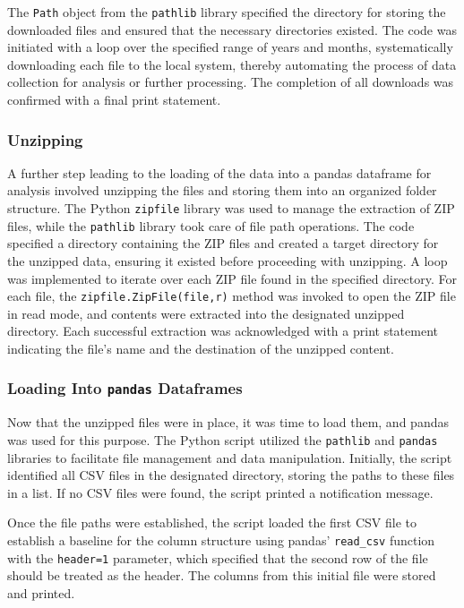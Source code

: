 \documentclass[
]{article}
\begin{document}
The \texttt{Path} object from the \texttt{pathlib} library specified the
directory for storing the downloaded files and ensured that the
necessary directories existed. The code was initiated with a loop over
the specified range of years and months, systematically downloading each
file to the local system, thereby automating the process of data
collection for analysis or further processing. The completion of all
downloads was confirmed with a final print statement.

\subsubsection{Unzipping}\label{unzipping}

A further step leading to the loading of the data into a pandas
dataframe for analysis involved unzipping the files and storing them
into an organized folder structure. The Python \texttt{zipfile} library
was used to manage the extraction of ZIP files, while the
\texttt{pathlib} library took care of file path operations. The code
specified a directory containing the ZIP files and created a target
directory for the unzipped data, ensuring it existed before proceeding
with unzipping. A loop was implemented to iterate over each ZIP file
found in the specified directory. For each file, the
\texttt{zipfile.ZipFile(file,\textquotesingle{}r\textquotesingle{})}
method was invoked to open the ZIP file in read mode, and contents were
extracted into the designated unzipped directory. Each successful
extraction was acknowledged with a print statement indicating the file's
name and the destination of the unzipped content.

\subsubsection{\texorpdfstring{Loading Into \texttt{pandas}
Dataframes}{Loading Into pandas Dataframes}}\label{loading-into-pandas-dataframes}

Now that the unzipped files were in place, it was time to load them, and
pandas was used for this purpose. The Python script utilized the
\texttt{pathlib} and \texttt{pandas} libraries to facilitate file
management and data manipulation. Initially, the script identified all
CSV files in the designated directory, storing the paths to these files
in a list. If no CSV files were found, the script printed a notification
message.

Once the file paths were established, the script loaded the first CSV
file to establish a baseline for the column structure using pandas'
\texttt{read\_csv} function with the \texttt{header=1} parameter, which
specified that the second row of the file should be treated as the
header. The columns from this initial file were stored and printed.
\end{document}
